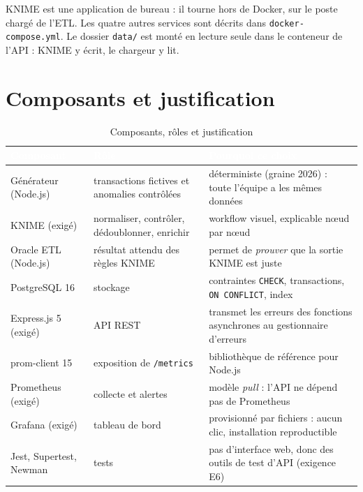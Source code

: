 KNIME est une application de bureau : il tourne hors de Docker, sur le poste chargé de l'ETL. Les
quatre autres services sont décrits dans \texttt{docker-compose.yml}. Le dossier \texttt{data/} est
monté en lecture seule dans le conteneur de l'API : KNIME y écrit, le chargeur y lit.

\section{Composants et justification}
\begin{table}[H]
\centering\small
\caption{Composants, rôles et justification}
\begin{tabularx}{\linewidth}{|l|X|X|}
\hline
\rowcolor{bluedark}\textcolor{white}{\textbf{Composant}} & \textcolor{white}{\textbf{Rôle}} & \textcolor{white}{\textbf{Pourquoi ce choix}} \\
\hline
Générateur (Node.js) & transactions fictives et anomalies contrôlées & déterministe (graine 2026) : toute l'équipe a les mêmes données \\
\hline
KNIME (exigé) & normaliser, contrôler, dédoublonner, enrichir & workflow visuel, explicable nœud par nœud \\
\hline
Oracle ETL (Node.js) & résultat attendu des règles KNIME & permet de \emph{prouver} que la sortie KNIME est juste \\
\hline
PostgreSQL 16 & stockage & contraintes \texttt{CHECK}, transactions, \texttt{ON CONFLICT}, index \\
\hline
Express.js 5 (exigé) & API REST & transmet les erreurs des fonctions asynchrones au gestionnaire d'erreurs \\
\hline
prom-client 15 & exposition de \texttt{/metrics} & bibliothèque de référence pour Node.js \\
\hline
Prometheus (exigé) & collecte et alertes & modèle \emph{pull} : l'API ne dépend pas de Prometheus \\
\hline
Grafana (exigé) & tableau de bord & provisionné par fichiers : aucun clic, installation reproductible \\
\hline
Jest, Supertest, Newman & tests & pas d'interface web, donc des outils de test d'API (exigence E6) \\
\hline
\end{tabularx}
\end{table}

